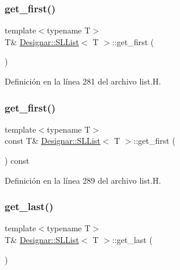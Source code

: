 \subsubsection{\texorpdfstring{get\+\_\+first()}{get\_first()}\hspace{0.1cm}{\footnotesize\ttfamily [1/2]}}
{\footnotesize\ttfamily template$<$typename T$>$ \\
T\& \hyperlink{class_designar_1_1_s_l_list}{Designar\+::\+S\+L\+List}$<$ T $>$\+::get\+\_\+first (\begin{DoxyParamCaption}{ }\end{DoxyParamCaption})\hspace{0.3cm}{\ttfamily [inline]}}



Definición en la línea 281 del archivo list.\+H.

\mbox{\label{class_designar_1_1_s_l_list_a2924b50936033843d23b2d384e751953}} 
\subsubsection{\texorpdfstring{get\+\_\+first()}{get\_first()}\hspace{0.1cm}{\footnotesize\ttfamily [2/2]}}
{\footnotesize\ttfamily template$<$typename T$>$ \\
const T\& \hyperlink{class_designar_1_1_s_l_list}{Designar\+::\+S\+L\+List}$<$ T $>$\+::get\+\_\+first (\begin{DoxyParamCaption}{ }\end{DoxyParamCaption}) const\hspace{0.3cm}{\ttfamily [inline]}}



Definición en la línea 289 del archivo list.\+H.

\mbox{\label{class_designar_1_1_s_l_list_ae56fe90795b8fb280bc7361a2426fe53}} 
\subsubsection{\texorpdfstring{get\+\_\+last()}{get\_last()}\hspace{0.1cm}{\footnotesize\ttfamily [1/2]}}
{\footnotesize\ttfamily template$<$typename T$>$ \\
T\& \hyperlink{class_designar_1_1_s_l_list}{Designar\+::\+S\+L\+List}$<$ T $>$\+::get\+\_\+last (\begin{DoxyParamCaption}{ }\end{DoxyParamCaption})\hspace{0.3cm}{\ttfamily [inline]}}



